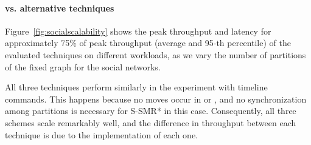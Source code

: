 

\paragraph*{\dynastar vs. alternative techniques}
\label{sec:evaluation:results}

Figure~\ref{fig:socialscalability} shows the peak throughput and latency for approximately 75\% of peak throughput
 (average and 95-th percentile) of the evaluated techniques on different workloads, as we vary the number of 
 partitions of the fixed graph for the social networks.

All three techniques perform similarly in the experiment with timeline commands. This happens because no moves occur in
\dynastar or \dssmr{}, and no synchronization among partitions is necessary for S-SMR* in this case. 
Consequently, all three schemes scale remarkably well, and
the difference in throughput between each technique is due to the implementation of each one.



